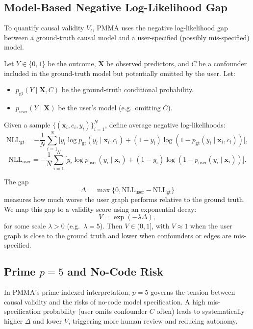 \documentclass[11pt]{article}
\begin{document}
\subsection{Model-Based Negative Log-Likelihood Gap}

To quantify causal validity $V_t$, PMMA uses the negative log-likelihood gap between a ground-truth causal model and a user-specified (possibly mis-specified) model.

Let $Y \in \{0,1\}$ be the outcome, $\bm{X}$ be observed predictors, and $C$ be a confounder included in the ground-truth model but potentially omitted by the user.
Let:
\begin{itemize}
  \item $p_\mathrm{gt}(Y \mid \bm{X}, C)$ be the ground-truth conditional probability.
  \item $p_\mathrm{user}(Y \mid \bm{X})$ be the user's model (e.g.\ omitting $C$).
\end{itemize}

Given a sample $\{(\bm{x}_i, c_i, y_i)\}_{i=1}^N$, define average negative log-likelihoods:
\[
  \mathrm{NLL}_\mathrm{gt} = -\frac{1}{N} \sum_{i=1}^N \bigl[y_i \log p_\mathrm{gt}(y_i \mid \bm{x}_i, c_i)
  + (1-y_i) \log(1-p_\mathrm{gt}(y_i \mid \bm{x}_i, c_i))\bigr],
\]
\[
  \mathrm{NLL}_\mathrm{user} = -\frac{1}{N} \sum_{i=1}^N \bigl[y_i \log p_\mathrm{user}(y_i \mid \bm{x}_i)
  + (1-y_i) \log(1-p_\mathrm{user}(y_i \mid \bm{x}_i))\bigr].
\]

The gap
\[
  \Delta = \max\{0, \mathrm{NLL}_\mathrm{user} - \mathrm{NLL}_\mathrm{gt}\}
\]
measures how much worse the user graph performs relative to the ground truth.
We map this gap to a validity score using an exponential decay:
\[
  V = \exp(-\lambda \Delta),
\]
for some scale $\lambda > 0$ (e.g.\ $\lambda = 5$).
Then $V \in (0,1]$, with $V \approx 1$ when the user graph is close to the ground truth and lower when confounders or edges are mis-specified.

\subsection{Prime $p=5$ and No-Code Risk}

In PMMA's prime-indexed interpretation, $p=5$ governs the tension between causal validity and the risks of no-code model specification.
A high mis-specification probability (user omits confounder $C$ often) leads to systematically higher $\Delta$ and lower $V$, triggering more human review and reducing autonomy.
\end{document}

